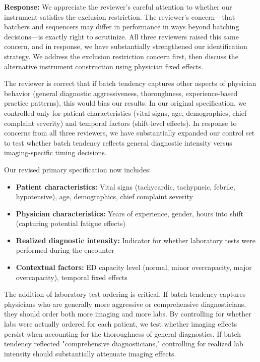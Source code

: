 \documentclass[11pt]{article}
\newcommand{\1}{\hbox{\rm 1\kern-.35em 1}}
\begin{document}
\noindent\textbf{Response:} \color{blue}We appreciate the reviewer's careful attention to whether our instrument satisfies the exclusion restriction. The reviewer's concern—that batchers and sequencers may differ in performance in ways beyond batching decisions—is exactly right to scrutinize. All three reviewers raised this same concern, and in response, we have substantially strengthened our identification strategy. We address the exclusion restriction concern first, then discuss the alternative instrument construction using physician fixed effects.

The reviewer is correct that if batch tendency captures other aspects of physician behavior (general diagnostic aggressiveness, thoroughness, experience-based practice patterns), this would bias our results. In our original specification, we controlled only for patient characteristics (vital signs, age, demographics, chief complaint severity) and temporal factors (shift-level effects). In response to concerns from all three reviewers, we have substantially expanded our control set to test whether batch tendency reflects general diagnostic intensity versus imaging-specific timing decisions.

Our revised primary specification now includes:

\begin{itemize}
\item \textbf{Patient characteristics:} Vital signs (tachycardic, tachypneic, febrile, hypotensive), age, demographics, chief complaint severity
\item \textbf{Physician characteristics:} Years of experience, gender, hours into shift (capturing potential fatigue effects)
\item \textbf{Realized diagnostic intensity:} Indicator for whether laboratory tests were performed during the encounter
\item \textbf{Contextual factors:} ED capacity level (normal, minor overcapacity, major overcapacity), temporal fixed effects
\end{itemize}

The addition of laboratory test ordering is critical. If batch tendency captures physicians who are generally more aggressive or comprehensive diagnosticians, they should order both more imaging and more labs. By controlling for whether labs were actually ordered for each patient, we test whether imaging effects persist when accounting for the thoroughness of general diagnostics. If batch tendency reflected "comprehensive diagnosticians," controlling for realized lab intensity should substantially attenuate imaging effects.
\end{document}
